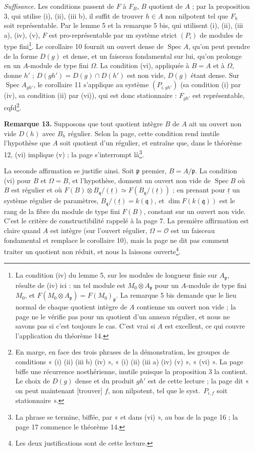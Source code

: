\documentclass[11pt,a4paper]{article}
\begin{document}
\emph{Suffisance.} Les conditions passent de $F$ à $F_B$, $B$ quotient de $A$ ;
par la proposition 3, qui utilise (i), (ii), (iii b), il suffit de
trouver $h \in A$ non nilpotent tel que $F_h$ soit représentable. Par le
lemme 5 et la remarque 5 bis, qui utilisent (i), (ii), (iii a), (iv), (v),
$F$ est pro-représentable par un système strict $(P_i)$ de modules de type
fini\footnote{La condition (iv) du lemme 5, sur les modules de longueur finie
sur $A_{\mathfrak{p}}$, résulte de (iv) ici : un tel module est
$M_0 \otimes A_{\mathfrak{p}}$ pour un $A$-module de type fini $M_0$, et
$F(M_0 \otimes A_{\mathfrak{p}}) = F(M_0)_{\mathfrak{p}}$. La remarque 5 bis
demande que le lieu normal de chaque quotient intègre de $A$ contienne un
ouvert non vide ; la page ne le vérifie pas pour un quotient d'un anneau
régulier, et nous ne savons pas si c'est toujours le cas. C'est vrai si $A$
est excellent, ce qui couvre l'application du théorème 14.}. Le corollaire 10
fournit un ouvert dense de $\operatorname{Spec} A$, qu'on peut prendre de la
forme $D(g)$ et dense, et un faisceau fondamental sur lui, qu'on prolonge en un
$A$-module de type fini $\Omega$. La condition (vi), appliquée à $B = A$ et à
$\Omega$, donne $h'$ ; $D(gh') = D(g) \cap D(h')$ est non vide, $D(g)$ étant
dense. Sur $\operatorname{Spec} A_{gh'}$, le corollaire 11 s'applique au
système $(P_{i, gh'})$ (sa condition (i) par (iv), sa condition (ii) par
(vi)), qui est donc stationnaire : $F_{gh'}$ est représentable, cqfd\footnote{En marge,
en face des trois phrases de la démonstration, les groupes de conditions
« (i) (ii) (iii b) (iv) », « (i) (ii) (iii a) (iv) (v) », « (vi) ». La page
biffe une récurrence noethérienne, inutile puisque la proposition 3 la
contient. Le choix de $D(g)$ dense et du produit $gh'$ est de cette lecture ;
la page dit « on peut maintenant [trouver] $f$, non nilpotent, tel que le
syst.\ $P_{i,f}$ soit stationnaire ».}.

\textbf{Remarque 13.} Supposons que tout quotient intègre $B$ de $A$ ait un
ouvert non vide $D(h)$ avec $B_h$ régulier. Selon la page, cette condition
rend inutile l'hypothèse que $A$ soit quotient d'un régulier, et entraîne
que, dans le théorème 12, (vi) implique (v) ; la page s'interrompt
là\footnote{La phrase se termine, biffée, par « et dans (vi) », au bas de la
page 16 ; la page 17 commence le théorème 14.}.

La seconde affirmation se justifie ainsi. Soit $\mathfrak{p}$ premier,
$B = A/\mathfrak{p}$. La condition (vi) pour $B$ et $\Omega = B$, et
l'hypothèse, donnent un ouvert non vide de $\operatorname{Spec} B$ où $B$ est
régulier et où $F(B) \otimes B_{\mathfrak{q}}/(\underline{t}) \simeq
F(B_{\mathfrak{q}}/(\underline{t}))$ ; en prenant pour $\underline{t}$ un
système régulier de paramètres, $B_{\mathfrak{q}}/(\underline{t}) =
k(\mathfrak{q})$, et $\dim F(k(\mathfrak{q}))$ est le rang de la fibre du
module de type fini $F(B)$, constant sur un ouvert non vide. C'est le critère
de constructibilité rappelé à la page 7. La première affirmation est claire
quand $A$ est intègre (sur l'ouvert régulier, $\Omega = \mathcal{O}$ est un
faisceau fondamental et remplace le corollaire 10), mais la page ne dit pas
comment traiter un quotient non réduit, et nous la laissons
ouverte\footnote{Les deux justifications sont de cette lecture.}.
\end{document}
